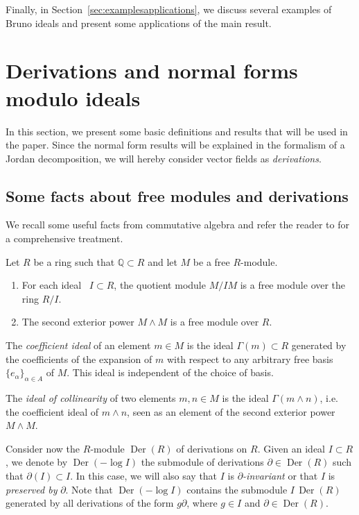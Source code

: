 \documentclass[10pt,twoside,reqno]{amsart}
\theoremstyle{remark}
\theoremstyle{remark}
\newcommand{\Q}{\mathbb{Q}}
\newcommand{\tmem}[1]{{\em #1\/}}
\newcommand{\tmop}[1]{{\operatorname{#1}}}
\begin{document}
Finally, in Section~\ref{sec:examplesapplications}, we discuss several examples
of Bruno ideals and present some applications of the main result.

\section{Derivations and normal forms modulo ideals}\label{sec:prelim}
In this section, we present some basic definitions and results that will be used in the paper. Since the normal form results will be explained in the formalism of a Jordan decomposition, we will hereby consider vector fields as {\em derivations}.
\subsection{Some facts about free modules and derivations}\label{subsec:derivfreemodule}
We recall some useful facts from commutative algebra and refer the reader to \cite{Eisenbud1995} for a comprehensive treatment. 

Let $R$ be a ring such that $\Q\subset R$ and let $M$ be a free $R$-module. 
\begin{enumerate}
    \item[(M.1)] For each ideal \ $I \subset R$, the quotient module $M / I M$ is a free module over the ring $R / I$.
    \item[(M.2)] The second exterior power $M \wedge M$ is a free module over $R$. 
\end{enumerate}
The {\tmem{coefficient ideal}} of an element $m \in M$ is the ideal
$\Gamma (m) \subset R$ generated by the coefficients of the expansion of $m$
with respect to any arbitrary free basis $\{ e_{\alpha} \}_{\alpha \in A}$ of
$M$. This ideal is independent of the choice of basis.

The {\tmem{ideal of collinearity}} of two elements $m, n \in M$ is the ideal
$\Gamma (m \wedge n)$, i.e. the coefficient ideal of $m \wedge n$, seen as an
element of the second exterior power $M \wedge M$.

Consider now the  $R$-module $\tmop{Der} (R)$ of derivations on $R$. Given an ideal $I\subset R$, we
denote by $\tmop{Der} (- \log I)$ the submodule of derivations $\partial \in
\tmop{Der} (R)$ such that $\partial (I) \subset I$. In this case, we will also
say that $I$ is {\tmem{{$\partial$}-invariant}} or that $I$ is {\tmem{preserved
by}} $\partial$. Note that $\tmop{Der}(-\log I)$ contains the submodule
$I\,\tmop{Der}(R)$ generated by all derivations of the form
$g\partial$, where $g\in I$ and $\partial\in\tmop{Der}(R)$.
\end{document}
